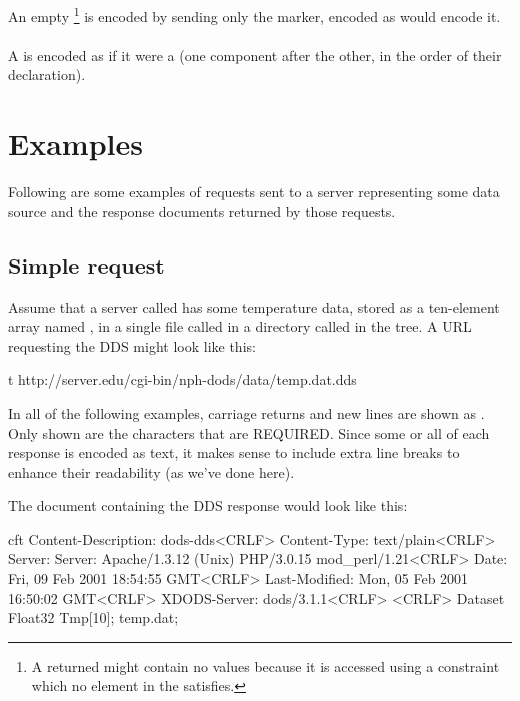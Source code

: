 \documentclass[justify]{nasa-ese}
\begin{document}
An empty \Sequence\footnote{A returned \Sequence might contain no values
  because it is accessed using a constraint which no element in the
  \Sequence satisfies.} is encoded by sending only the 
marker, encoded as  would encode it. 

\paragraph{\Grid}
A \Grid is encoded as if it were a \Structure (one component after the other,
in the order of their declaration).

\section{Examples}
\label{sec-examples}

Following are some examples of requests sent to a server representing
some data source and the response documents returned by those
requests.

\subsection{Simple request}

Assume that a server called  has some temperature
data, stored as a ten-element array named , in a single file
called  in a directory called  in the
 tree. A \DAP URL requesting the DDS might look like this:

\begin{vcode}{t}
http://server.edu/cgi-bin/nph-dods/data/temp.dat.dds
\end{vcode}

In all of the following examples, carriage returns and new lines are shown as
. Only shown are the  characters that
are REQUIRED. Since some or all of each response is encoded as text, it makes
sense to include extra line breaks to enhance their readability (as we've
done here).

The document containing the DDS response would look like this:

\begin{vcode}{cft}
Content-Description: dods-dds<CRLF>
Content-Type: text/plain<CRLF>
Server: Server: Apache/1.3.12 (Unix)  PHP/3.0.15 mod_perl/1.21<CRLF>
Date: Fri, 09 Feb 2001 18:54:55 GMT<CRLF>
Last-Modified: Mon, 05 Feb 2001 16:50:02 GMT<CRLF>
XDODS-Server: dods/3.1.1<CRLF>
<CRLF>
Dataset {
  Float32 Tmp[10];
} temp.dat;
\end{vcode}
\end{document}
